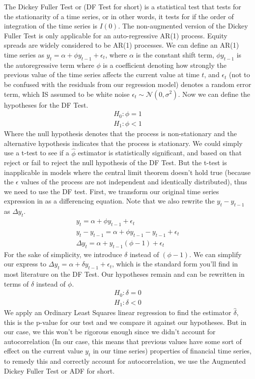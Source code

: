 \documentclass{article}
\begin{document}
\begin{spacing}{2.0}
The Dickey Fuller Test or (DF Test for short) is a statistical test that tests for the stationarity of a time series, or in other words, it tests for if the
order of integration of the time series is $I(0)$. The non-augmented version of the Dickey Fuller Test is only applicable for an auto-regressive AR(1) process.
Equity spreads are widely considered to be AR(1) processes. We can define an AR(1) time series as $y_{t} = \alpha + \phi y_{t - 1} + \epsilon_{t}$, where $\alpha$ is
the constant shift term, $\phi y_{t - 1}$ is the autoregressive term where $\phi$ is a coefficient denoting how strongly the previous value of the time series
affects the current value at time $t$, and $\epsilon_{t}$ (not to be confused with the residuals from our regression model) denotes a random error term, which IS
assumed to be white noise $\epsilon_{t} \sim \mathcal{N}(0, \sigma^2)$. Now we can define the hypotheses for the DF Test.
\begin{gather*}
    H_{0} : \phi = 1 \\
    H_{1} : \phi < 1
\end{gather*}
Where the null hypothesis denotes that the process is non-stationary and the alternative hypothesis indicates that the process is stationary. We could simply use a t-test
to see if a $\hat \phi$ estimator is statistically significant, and based on that reject or fail to reject the null hypothesis of the DF Test. But the t-test is inapplicable
in models where the central limit theorem doesn't hold true (because the $\epsilon$ values of the process are not independent and identically distributed), thus we need to use the
DF test. First, we transform our original time series expression in as a differencing equation. Note that we also rewrite the $y_{t} - y_{t - 1}$ as $\Delta y_{t}$.
\begin{gather*}
    y_{t} = \alpha + \phi y_{t - 1} + \epsilon_{t} \\
    y_{t} - y_{t - 1} = \alpha + \phi y_{t - 1} - y_{t - 1} + \epsilon_{t} \\
    \Delta y_{t} = \alpha + y_{t - 1} (\phi - 1) + \epsilon_{t}
\end{gather*}
For the sake of simplicity, we introduce $\delta$ instead of $(\phi - 1)$. We can simplify our express to $\Delta y_{t} = \alpha + \delta y_{t - 1} + \epsilon_{t}$, which is
the standard form you'll find in most literature on the DF Test. Our hypotheses remain and can be rewritten in terms of $\delta$ instead of $\phi$.
\begin{gather*}
    H_{0} : \delta = 0 \\
    H_{1} : \delta < 0
\end{gather*}
We apply an Ordinary Least Squares linear regression to find the estimator $\hat \delta$, this is the p-value for our test and we compare it against our hypotheses. But in our case,
we this won't be rigorous enough since we didn't account for autocorrelation (In our case, this means that previous values have some sort of effect on the current value $y_{t}$ in our
time series) properties of financial time series, to remedy this and correctly account for autocorrelation, we use the Augmented Dickey Fuller Test or ADF for short.


\end{spacing}
\end{document}
